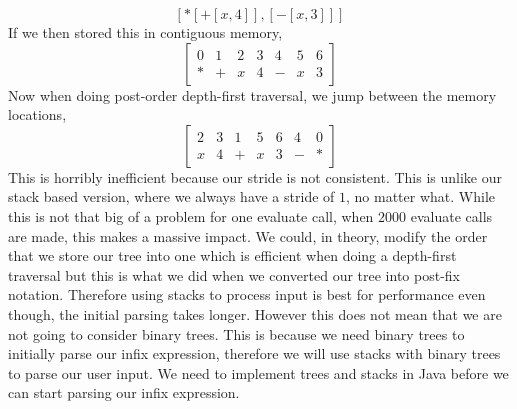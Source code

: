 \documentclass[../../../../../main.tex]{subfiles}
\begin{document}
\[[* [+ [x,4] ],[- [x,3] ] ]\]
If we then stored this in contiguous memory,
\[\begin{bmatrix}
0 & 1 & 2 & 3 & 4 & 5 & 6 \\
* & + & x & 4 & - & x & 3
 \end{bmatrix}\]
Now when doing post-order depth-first traversal, we jump between the memory locations,
\[\begin{bmatrix}
2 & 3 & 1 & 5 & 6 & 4 & 0 \\
x & 4 & + & x & 3 & - & *
 \end{bmatrix}\]
This is horribly inefficient because our stride is not consistent. This is unlike our stack based version, where we always have a stride of $1$, no matter what. While this is not that big of a problem for one evaluate call, when $2000$ evaluate calls are made, this makes a massive impact. We could, in theory, modify the order that we store our tree into one which is efficient when doing a depth-first traversal but this is what we did when we converted our tree into post-fix notation. Therefore using stacks to process input is best for performance even though, the initial parsing takes longer. However this does not mean that we are not going to consider binary trees. This is because we need binary trees to initially parse our infix expression, therefore we will use stacks with binary trees to parse our user input. We need to implement trees and stacks in Java before we can start parsing our infix expression.
\newpage
\end{document}
